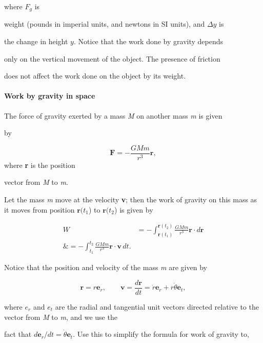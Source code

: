 where $F _g$ is

weight (pounds in imperial units, and newtons in SI units), and $\Delta y$ is

the change in height $y$. Notice that the work done by gravity depends

only on the vertical movement of the object. The presence of friction

does not affect the work done on the object by its weight.



\paragraph{Work by gravity in space}



The force of gravity exerted by a mass \textit{M} on another mass \textit{m} is given

by



$$\mathbf{F}=-\frac{GMm}{r^3}\mathbf{r},$$ where \textbf{r} is the position

vector from \textit{M} to \textit{m}.



Let the mass \textit{m} move at the velocity \textbf{v}; then the work of gravity on this mass as it moves from position $\mathbf{r}(t _1$) to $\mathbf{r}(t _2$) is given by



\begin{align}
W &= -\int^{\mathbf{r}(t _2)} _{\mathbf{r}(t _1)}\frac{GMm}{r^3}\mathbf{r}\cdot d\mathbf{r} \\\&= -\int^{t _2} _{t _1}\frac{GMm}{r^3}\mathbf{r}\cdot\mathbf{v}\,dt.
\end{align}



Notice that the position and velocity of the mass \textit{m} are given by



$$\mathbf{r} = r\mathbf{e} _r, \qquad\mathbf{v} =  \frac{d\mathbf{r}}{dt} = \dot{r}\mathbf{e} _r + r\dot{\theta}\mathbf{e} _t,$$

where $e _r$ and $e _t$ are the radial and tangential unit vectors directed relative to the vector from \textit{M} to \textit{m}, and we use the

fact that $d \mathbf{e} _r/dt  = \dot{\theta}\mathbf{e} _t$. Use this to simplify the formula for work of gravity to,



